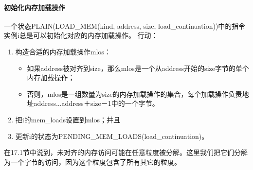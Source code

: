 \paragraph{初始化内存加载操作}\label{omm:initiate_load}
一个状态PLAIN(LOAD_MEM(kind, address, size, load_continuation))中的指令实例i总是可以初始化对应的内存加载操作。
行动：
\begin{enumerate}
\item 构造合适的内存加载操作mlos：  %
  \begin{itemize}
  \item 如果address被对齐到size，那么mlos是一个从address开始的size字节的单个内存加载操作； %
  \item 否则，mlos是一组数量为size的内存加载操作的集合，每个加载操作负责地址address...address＋size－1中的一个字节。  %
  \end{itemize}
\item 把i的mem_loads设置到mlos；并且  %
\item 更新i的状态为PENDING_MEM_LOADS(load_continuation)。  %
\end{enumerate}

\begin{commentary}
  在17.1节中说到，未对齐的内存访问可能在任意粒度被分解。这里我们把它们分解为一个字节的访问，因为这个粒度包含了所有其它的粒度。
\end{commentary}

